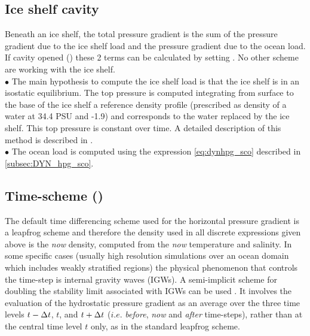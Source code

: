 \documentclass[../tex_main/NEMO_manual]{subfiles}
\begin{document}
\subsection{Ice shelf cavity}
\label{subsec:DYN_hpg_isf}
Beneath an ice shelf, the total pressure gradient is the sum of the pressure gradient due to the ice shelf load and
 the pressure gradient due to the ocean load. If cavity opened () these 2 terms can be
 calculated by setting . No other scheme are working with the ice shelf.\\

$\bullet$ The main hypothesis to compute the ice shelf load is that the ice shelf is in an isostatic equilibrium.
 The top pressure is computed integrating from surface to the base of the ice shelf a reference density profile 
(prescribed as density of a water at 34.4 PSU and -1.9\degC) and corresponds to the water replaced by the ice shelf. 
This top pressure is constant over time. A detailed description of this method is described in \citet{Losch2008}.\\

$\bullet$ The ocean load is computed using the expression \autoref{eq:dynhpg_sco} described in \autoref{subsec:DYN_hpg_sco}. 

\subsection{Time-scheme (\protect{})}
\label{subsec:DYN_hpg_imp}

The default time differencing scheme used for the horizontal pressure gradient is 
a leapfrog scheme and therefore the density used in all discrete expressions given 
above is the  \textit{now} density, computed from the \textit{now} temperature and 
salinity. In some specific cases (usually high resolution simulations over an ocean 
domain which includes weakly stratified regions) the physical phenomenon that 
controls the time-step is internal gravity waves (IGWs). A semi-implicit scheme for 
doubling the stability limit associated with IGWs can be used \citep{Brown_Campana_MWR78, 
Maltrud1998}. It involves the evaluation of the hydrostatic pressure gradient as an 
average over the three time levels $t-\Delta t$, $t$, and $t+\Delta t$ ($i.e.$  
\textit{before},  \textit{now} and  \textit{after} time-steps), rather than at the central 
time level $t$ only, as in the standard leapfrog scheme. 
\end{document}

